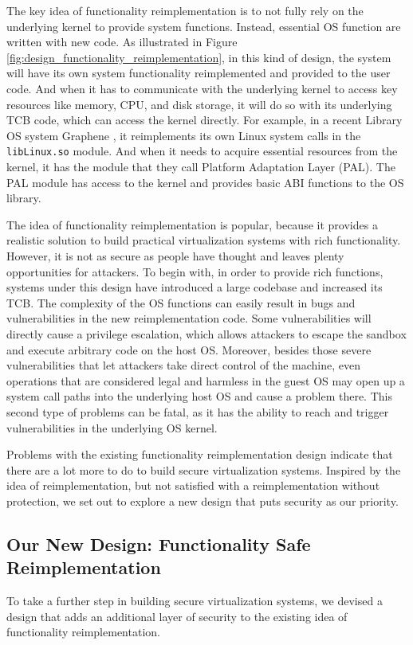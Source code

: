 The key idea of functionality reimplementation is to not fully rely on the underlying kernel to provide system functions. 
Instead, essential OS function are written with new code. As illustrated in Figure \ref{fig:design_functionality_reimplementation}, 
in this kind of design, the system will have its own system functionality reimplemented and provided to the user code. And when 
it has to communicate with the underlying kernel to access key resources like memory, CPU, and disk storage, it will do so with 
its underlying TCB code, which can access the kernel directly. 
For example, in a recent Library OS system Graphene \cite{Graphene-14}, it reimplements its own Linux system calls in the 
\texttt{libLinux.so} module. And when it needs to acquire essential resources from the kernel, it has the module that they call 
Platform Adaptation Layer (PAL). The PAL module has access to the kernel and provides basic ABI functions to the OS library.  

The idea of functionality reimplementation is popular, because it provides a realistic solution to build practical virtualization systems 
with rich functionality. However, it is not as secure as people have thought and leaves plenty opportunities for attackers. 
To begin with, in order to provide rich functions, systems under this design have introduced a large codebase and increased its TCB. 
The complexity of the OS functions can easily result in bugs and vulnerabilities in the new reimplementation code. Some vulnerabilities 
will directly cause a privilege escalation, which allows attackers to escape the sandbox and execute arbitrary code on the host OS. 
Moreover, besides those severe vulnerabilities that let attackers take direct control of the machine, even operations that are considered 
legal and harmless in the guest OS may open up a system call paths into the underlying host OS and cause a problem there. 
This second type of problems can be fatal, as it has the ability to reach and trigger vulnerabilities in the underlying OS kernel. 

Problems with the existing functionality reimplementation design indicate that there are a lot more to do to build secure virtualization systems. 
Inspired by the idea of reimplementation, but not satisfied with a reimplementation without protection, we set out to explore a new design 
that puts security as our priority.  

\subsection {Our New Design: Functionality Safe Reimplementation}
To take a further step in building secure virtualization systems, 
we devised a design that adds an additional layer of security to 
the existing idea of functionality reimplementation.

